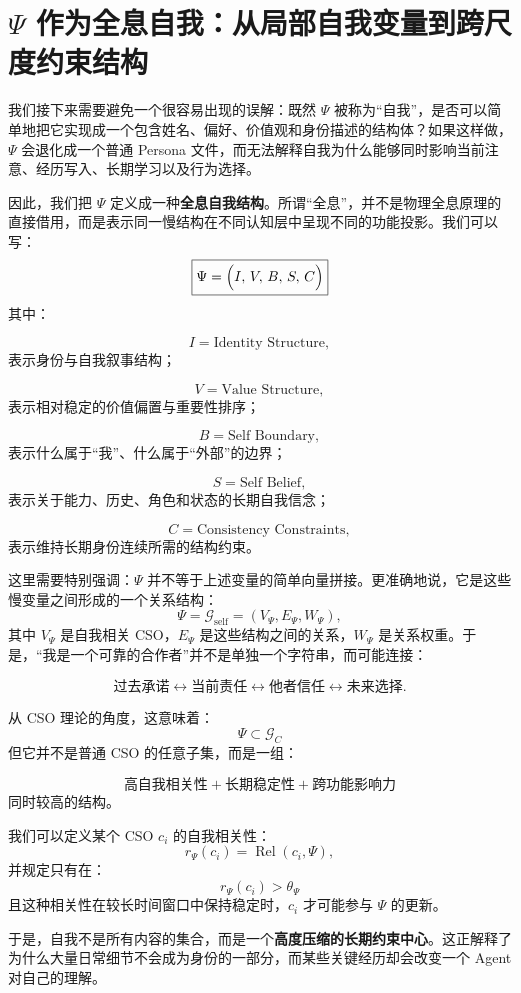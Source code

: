 \section{$\Psi$ 作为全息自我：从局部自我变量到跨尺度约束结构}

我们接下来需要避免一个很容易出现的误解：既然 $\Psi$ 被称为“自我”，是否可以简单地把它实现成一个包含姓名、偏好、价值观和身份描述的结构体？如果这样做，$\Psi$ 会退化成一个普通 Persona 文件，而无法解释自我为什么能够同时影响当前注意、经历写入、长期学习以及行为选择。

因此，我们把 $\Psi$ 定义成一种\textbf{全息自我结构}。所谓“全息”，并不是物理全息原理的直接借用，而是表示同一慢结构在不同认知层中呈现不同的功能投影。我们可以写：
\[
\boxed{
\Psi
=
\Bigl(
I,\,
V,\,
B,\,
S,\,
C
\Bigr)
}
\]
其中：

\[
I=\text{Identity Structure},
\]
表示身份与自我叙事结构；

\[
V=\text{Value Structure},
\]
表示相对稳定的价值偏置与重要性排序；

\[
B=\text{Self Boundary},
\]
表示什么属于“我”、什么属于“外部”的边界；

\[
S=\text{Self Belief},
\]
表示关于能力、历史、角色和状态的长期自我信念；

\[
C=\text{Consistency Constraints},
\]
表示维持长期身份连续所需的结构约束。

这里需要特别强调：$\Psi$ 并不等于上述变量的简单向量拼接。更准确地说，它是这些慢变量之间形成的一个关系结构：
\[
\Psi
=
\mathcal{G}_{\mathrm{self}}
=
(V_\Psi,E_\Psi,W_\Psi),
\]
其中 $V_\Psi$ 是自我相关 CSO，$E_\Psi$ 是这些结构之间的关系，$W_\Psi$ 是关系权重。于是，“我是一个可靠的合作者”并不是单独一个字符串，而可能连接：

\[
\text{过去承诺}
\leftrightarrow
\text{当前责任}
\leftrightarrow
\text{他者信任}
\leftrightarrow
\text{未来选择}.
\]

从 CSO 理论的角度，这意味着：
\[
\boxed{
\Psi
\subset
\mathcal{G}_C
}
\]
但它并不是普通 CSO 的任意子集，而是一组：

\[
\text{高自我相关性}
+
\text{长期稳定性}
+
\text{跨功能影响力}
\]
同时较高的结构。

我们可以定义某个 CSO $c_i$ 的自我相关性：
\[
r_\Psi(c_i)
=
\operatorname{Rel}(c_i,\Psi),
\]
并规定只有在：
\[
r_\Psi(c_i)>\theta_\Psi
\]
且这种相关性在较长时间窗口中保持稳定时，$c_i$ 才可能参与 $\Psi$ 的更新。

于是，自我不是所有内容的集合，而是一个\textbf{高度压缩的长期约束中心}。这正解释了为什么大量日常细节不会成为身份的一部分，而某些关键经历却会改变一个 Agent 对自己的理解。

